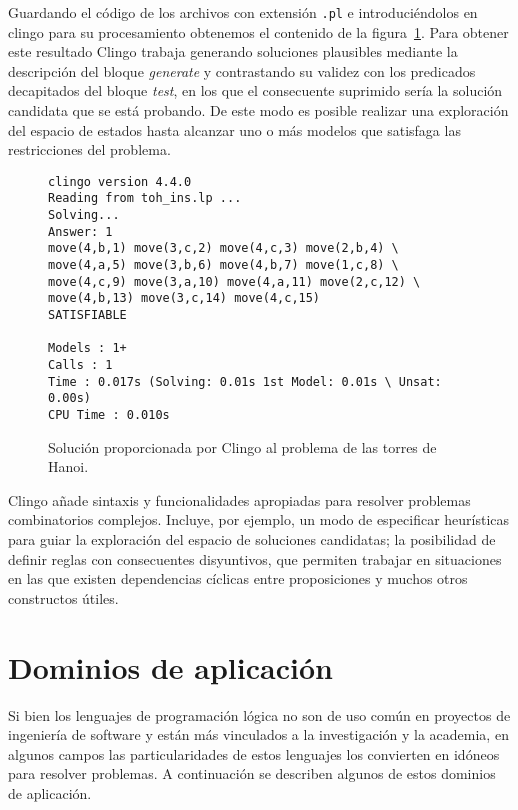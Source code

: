 \documentclass[11pt,captions=nooneline,DIV=14, parskip=full]{scrartcl}
\begin{document}
Guardando el código de los archivos con extensión \texttt{.pl} e introduciéndolos en clingo para su procesamiento obtenemos el contenido de la figura~\ref{fig:clingosol}. Para obtener este resultado Clingo trabaja generando soluciones plausibles mediante la descripción del bloque \textit{generate} y contrastando su validez con los predicados decapitados del bloque \textit{test}, en los que el consecuente suprimido sería la solución candidata que se está probando. De este modo es posible realizar una exploración del espacio de estados hasta alcanzar uno o más modelos que satisfaga las restricciones del problema.

\begin{figure}[!htbp]
\begin{lstlisting}[frame=single]
clingo version 4.4.0
Reading from toh_ins.lp ...
Solving...
Answer: 1
move(4,b,1) move(3,c,2) move(4,c,3) move(2,b,4) \
move(4,a,5) move(3,b,6) move(4,b,7) move(1,c,8) \
move(4,c,9) move(3,a,10) move(4,a,11) move(2,c,12) \
move(4,b,13) move(3,c,14) move(4,c,15)
SATISFIABLE

Models : 1+
Calls : 1
Time : 0.017s (Solving: 0.01s 1st Model: 0.01s \ Unsat: 0.00s)
CPU Time : 0.010s
\end{lstlisting} 
\caption{Solución proporcionada por Clingo al problema de las torres de Hanoi.}
\label{fig:clingosol}
\end{figure}

Clingo añade sintaxis y funcionalidades apropiadas para resolver problemas combinatorios complejos. Incluye, por ejemplo, un modo de especificar heurísticas para guiar la exploración del espacio de soluciones candidatas; la posibilidad de definir reglas con consecuentes disyuntivos, que permiten trabajar en situaciones en las que existen dependencias cíclicas entre proposiciones y muchos otros constructos útiles.

\section{Dominios de aplicación}
\label{sec:dominios}
Si bien los lenguajes de programación lógica no son de uso común en proyectos de ingeniería de software y están más vinculados a la investigación y la academia, en algunos campos las particularidades de estos lenguajes los convierten en idóneos para resolver problemas. A continuación se describen algunos de estos dominios de aplicación.
\end{document}
